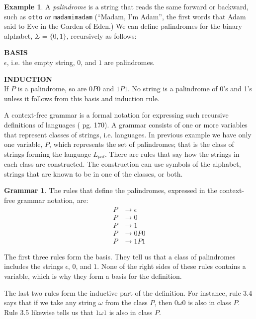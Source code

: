 \documentclass[a4paper,oneside,11pt]{book}
\theoremstyle{definition}
\newtheorem{exmp}{Example}[section]
\newtheorem{grmr}{Grammar}[section]
\begin{document}
\begin{exmp}
A \emph{palindrome} is a string that reads the same forward or backward, such as \verb|otto| or
\verb|madamimadam| (``Madam, I'm Adam'', the first words that Adam said to Eve in the Garden of Eden.)
We can define palindromes for the binary alphabet, $\Sigma = \{0, 1\}$, recursively as follows:

\begin{flushleft}
\textbf{BASIS}\\
$\epsilon$, i.e. the empty string, $0$, and $1$ are palindromes.
\end{flushleft}

\begin{flushleft}
\textbf{INDUCTION}\\
If $P$ is a palindrome, so are $0P0$ and $1P1$. No string is a palindrome of 0's and 1's unless it follows from this basis and induction rule.
\end{flushleft}

A context-free grammar is a formal notation for expressing such recursive definitions of languages (\cite{AUTOMATA} pg. 170).
A grammar consists of one or more variables that represent classes of strings, i.e. languages. In previous example we have only one variable, $P$,
which represents the set of palindromes; that is the class of strings forming the language $L_{pal}$. There are rules that say how the strings in
each class are constructed. The construction can use symbols of the alphabet, strings that are known to be in one of the classes, or both.

\begin{grmr}\label{pgram}
The rules that define the palindromes, expressed in the context-free grammar notation, are:
\begin{align}
P &\rightarrow \epsilon\\
P &\rightarrow 0\\
P &\rightarrow 1\\
P &\rightarrow 0P0\\
P &\rightarrow 1P1
\end{align}
\end{grmr}

The first three rules form the basis. They tell us that a class of palindromes includes the strings $\epsilon$, $0$, and $1$.
None of the right sides of these rules contains a variable, which is why they form a basis for the definition.

The last two rules form the inductive part of the definition. For instance, rule 3.4 says that if we take any string $\omega$ from the class $P$,
then $0\omega0$ is also in class $P$. Rule 3.5 likewise tells us that $1\omega1$ is also in class $P$.
\end{exmp}
\end{document}
